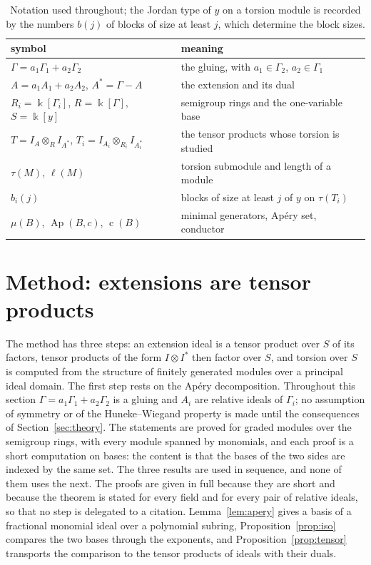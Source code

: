 \documentclass[11pt]{article}
\theoremstyle{definition}
\theoremstyle{remark}
\newcommand{\kk}{\Bbbk}
\newcommand{\Ap}{\operatorname{Ap}}
\newcommand{\tor}{\tau}
\newcommand{\len}{\ell}
\newcommand{\cond}{\operatorname{c}}
\begin{document}
\begin{table}[t]
\centering\small
\begin{tabular}{ll}
\toprule
symbol & meaning\\
\midrule
$\Gamma=a_1\Gamma_1+a_2\Gamma_2$ & the gluing, with $a_1\in\Gamma_2$, $a_2\in\Gamma_1$\\
$A=a_1A_1+a_2A_2$, $A^*=\Gamma-A$ & the extension and its dual\\
$R_i=\kk[\Gamma_i]$, $R=\kk[\Gamma]$, $S=\kk[y]$ & semigroup rings and the one-variable base\\
$T=I_A\otimes_RI_{A^*}$, $T_i=I_{A_i}\otimes_{R_i}I_{A_i^*}$ & the tensor products whose torsion is studied\\
$\tor(M)$, $\len(M)$ & torsion submodule and length of a module\\
$b_i(j)$ & blocks of size at least $j$ of $y$ on $\tor(T_i)$\\
$\mu(B)$, $\Ap(B,c)$, $\cond(B)$ & minimal generators, Ap\'ery set, conductor\\
\bottomrule
\end{tabular}
\caption{Notation used throughout; the Jordan type of $y$ on a torsion module is recorded by the numbers $b(j)$ of
blocks of size at least $j$, which determine the block sizes.}\label{tab:notation}
\end{table}

\section{Method: extensions are tensor products}\label{sec:factor}

The method has three steps: an extension ideal is a tensor product over $S$ of its factors, tensor products of the
form $I\otimes I^*$ then factor over $S$, and torsion over $S$ is computed from the structure of finitely generated
modules over a principal ideal domain. The first step rests on the Ap\'ery decomposition.
Throughout this section $\Gamma=a_1\Gamma_1+a_2\Gamma_2$ is a gluing and $A_i$ are relative ideals of $\Gamma_i$; no assumption of symmetry or of the
Huneke--Wiegand property is made until the consequences of Section~\ref{sec:theory}. The statements are proved for graded modules over the semigroup rings, with
every module spanned by monomials, and each proof is a short computation on bases: the content is that the bases of the two sides are indexed by the same set.
The three results are used in sequence, and none of them uses the next. The proofs are given in full because they are short and because the theorem is stated for every field and for every pair of relative ideals, so that no step is delegated to a citation. Lemma~\ref{lem:apery} gives a basis of a fractional monomial ideal over a polynomial subring, Proposition~\ref{prop:iso} compares the two bases through
the exponents, and Proposition~\ref{prop:tensor} transports the comparison to the tensor products of ideals with their duals.
\end{document}
